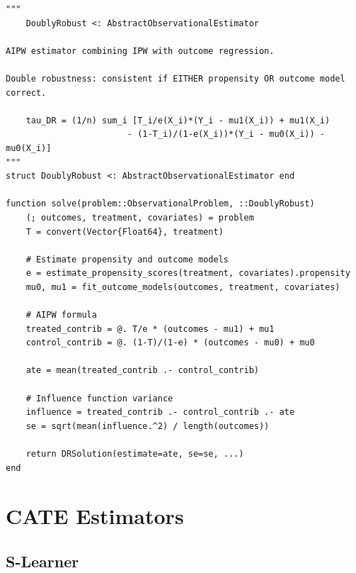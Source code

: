 \begin{verbatim}
"""
    DoublyRobust <: AbstractObservationalEstimator

AIPW estimator combining IPW with outcome regression.

Double robustness: consistent if EITHER propensity OR outcome model correct.

    tau_DR = (1/n) sum_i [T_i/e(X_i)*(Y_i - mu1(X_i)) + mu1(X_i)
                        - (1-T_i)/(1-e(X_i))*(Y_i - mu0(X_i)) - mu0(X_i)]
"""
struct DoublyRobust <: AbstractObservationalEstimator end

function solve(problem::ObservationalProblem, ::DoublyRobust)
    (; outcomes, treatment, covariates) = problem
    T = convert(Vector{Float64}, treatment)

    # Estimate propensity and outcome models
    e = estimate_propensity_scores(treatment, covariates).propensity
    mu0, mu1 = fit_outcome_models(outcomes, treatment, covariates)

    # AIPW formula
    treated_contrib = @. T/e * (outcomes - mu1) + mu1
    control_contrib = @. (1-T)/(1-e) * (outcomes - mu0) + mu0

    ate = mean(treated_contrib .- control_contrib)

    # Influence function variance
    influence = treated_contrib .- control_contrib .- ate
    se = sqrt(mean(influence.^2) / length(outcomes))

    return DRSolution(estimate=ate, se=se, ...)
end
\end{verbatim}

\section{CATE Estimators}
\label{sec:julia_cate}

\subsection{S-Learner}


